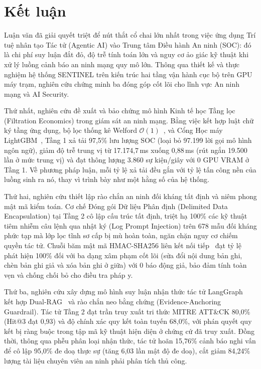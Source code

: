 \chapter{Kết luận}
\label{ch:conclusion}

Luận văn đã giải quyết triệt để nút thắt cổ chai lớn nhất trong việc ứng dụng Trí tuệ nhân tạo Tác tử (Agentic AI) vào Trung tâm Điều hành An ninh (SOC): đó là chi phí suy luận đắt đỏ, độ trễ tính toán lớn và nguy cơ ảo giác kỹ thuật khi xử lý luồng cảnh báo an ninh mạng quy mô lớn. Thông qua thiết kế và thực nghiệm hệ thống SENTINEL trên kiến trúc hai tầng vận hành cục bộ trên GPU máy trạm, nghiên cứu chứng minh ba đóng góp cốt lõi cho lĩnh vực An ninh mạng và AI Security.

Thứ nhất, nghiên cứu đề xuất và bảo chứng mô hình Kinh tế học Tầng lọc (Filtration Economics) trong giám sát an ninh mạng. Bằng việc kết hợp luật chữ ký tầng ứng dụng, bộ lọc thống kê Welford $\mathcal{O}(1)$~\cite{welford1962}, và Cổng Học máy LightGBM~\cite{ke2017lightgbm}, Tầng 1 xả tải 97,5\% lưu lượng SOC (loại bỏ 97.199 lời gọi mô hình ngôn ngữ), giảm độ trễ trung vị từ 17.174,7\,ms xuống 0,88\,ms (rút ngắn 19.500 lần ở mức trung vị) và đạt thông lượng 3.860 sự kiện/giây với 0 GPU VRAM ở Tầng 1. Về phương pháp luận, mỗi tỷ lệ xả tải đều gắn với tỷ lệ tấn công nền của luồng sinh ra nó, thay vì trình bày như một hằng số của hệ thống.

Thứ hai, nghiên cứu thiết lập rào chắn an ninh đối kháng tất định và niêm phong mật mã kiểm toán. Cơ chế Đóng gói Dữ liệu Phân định (Delimited Data Encapsulation) tại Tầng 2 cô lập cấu trúc tất định, triệt hạ 100\% các kỹ thuật tiêm nhiễm câu lệnh qua nhật ký (Log Prompt Injection) trên 678 mẫu đối kháng phức tạp mà lớp lọc tĩnh sơ cấp bị mù hoàn toàn, ngăn chặn nguy cơ chiếm quyền tác tử. Chuỗi băm mật mã HMAC-SHA256 liên kết nối tiếp~\cite{hmac1997} đạt tỷ lệ phát hiện 100\% đối với ba dạng xâm phạm cốt lõi (sửa đổi nội dung bản ghi, chèn bản ghi giả và xóa bản ghi ở giữa) với 0 báo động giả, bảo đảm tính toàn vẹn và chống chối bỏ cho điều tra pháp y.

Thứ ba, nghiên cứu xây dựng mô hình suy luận nhận thức tác tử LangGraph~\cite{langgraph2024} kết hợp Dual-RAG~\cite{rag2020} và rào chắn neo bằng chứng (Evidence-Anchoring Guardrail). Tác tử Tầng 2 đạt trần truy xuất tri thức MITRE ATT\&CK 80,0\% (Hit@3 đạt 0,93) và độ chính xác quy kết toàn tuyến 68,0\%, với phán quyết quy kết bị ràng buộc trong tập mã kỹ thuật hiện diện ở chứng cứ đã truy xuất. Đồng thời, thông qua phễu phân loại nhận thức, tác tử hoãn 15,76\% cảnh báo nghi vấn để cô lập 95,0\% đe doạ thực sự (tăng 6,03 lần mật độ đe doạ), cắt giảm 84,24\% lượng tài liệu chuyên viên an ninh phải phân tích thủ công.

